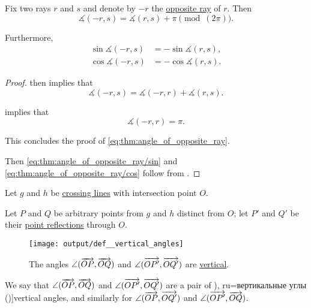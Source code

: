 \begin{corollary}\label{thm:angle_of_opposite_ray}
  Fix two rays \( r \) and \( s \) and denote by \( -r \) the \hyperref[def:geometric_ray/opposite]{opposite ray} of \( r \). Then
  \begin{equation}\label{eq:thm:angle_of_opposite_ray}
    \measuredangle(-r, s) = \measuredangle(r, s) + \pi \pmod (2\pi).
  \end{equation}

  Furthermore,
  \begin{align}
    \sin \measuredangle(-r, s) &= - \sin \measuredangle(r, s), \label{eq:thm:angle_of_opposite_ray/sin} \\
    \cos \measuredangle(-r, s) &= - \cos \measuredangle(r, s). \label{eq:thm:angle_of_opposite_ray/cos}
  \end{align}
\end{corollary}
\begin{proof}
   then implies that
  \begin{equation*}
    \measuredangle(-r, s) = \measuredangle(-r, r) + \measuredangle(r, s).
  \end{equation*}

   implies that
  \begin{equation*}
    \measuredangle(-r, r) = \pi.
  \end{equation*}

  This concludes the proof of \eqref{eq:thm:angle_of_opposite_ray}.

  Then \eqref{eq:thm:angle_of_opposite_ray/sin} and \eqref{eq:thm:angle_of_opposite_ray/cos} follow from .
\end{proof}

\begin{definition}\label{def:vertical_angles}
  Let \( g \) and \( h \) be \hyperref[def:crossing_lines]{crossing lines} with intersection point \( O \).

  Let \( P \) and \( Q \) be arbitrary points from \( g \) and \( h \) distinct from \( O \); let \( P' \) and \( Q' \) be their \hyperref[def:rigid_motion/point_reflection]{point reflections} through \( O \).

  \begin{figure}[!ht]
    \centering
    \texttt{[image: output/def\_\_vertical\_angles]}
    \caption{The angles \( \angle(\overrightarrow{OP}, \overrightarrow{OQ}) \) and \( \angle(\overrightarrow{OP'}, \overrightarrow{OQ'}) \) are \hyperref[def:vertical_angles]{vertical}.}\label{fig:def:vertical_angles}
  \end{figure}

  We say that \( \angle(\overrightarrow{OP}, \overrightarrow{OQ}) \) and \( \angle(\overrightarrow{OP'}, \overrightarrow{OQ'}) \) are a pair of \term[bg=вертикални/срещуположни ъгли (\cite[\S 7]{Гюзелев1873Геометрія}), ru=вертикальные углы (\cite[\S 26]{Киселёв2004Геометрия})]{vertical angles}, and similarly for \( \angle(\overrightarrow{OP}, \overrightarrow{OQ'}) \) and \( \angle(\overrightarrow{OP'}, \overrightarrow{OQ}) \).
\end{definition}

